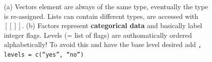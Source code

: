 \begin{figure}[htb]\begin{center}
\caption{(a) Vectors element are always of the same type, eventually the type is re-assigned. Lists can contain different types, are accessed with $[[]]$. 
(b) Factors represent {\bf categorical data} and basically label integer flags. Levels (= list of flags) are authomatically ordered alphabetically! 
To avoid this and have the base level desired add \texttt{, levels = c(``yes'', ``no'')}}
\end{center}\end{figure}



\begin{figure}[htb]\begin{center}
\caption{}
\end{center}\end{figure}


